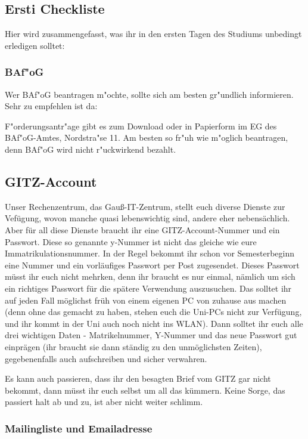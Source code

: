 \subsection{Ersti Checkliste}

Hier wird zusammengefasst, was ihr in den ersten Tagen des Studiums
unbedingt erledigen solltet:

\subsubsection{BAf"oG}

Wer BAf"oG beantragen m"ochte, sollte sich am besten gr"undlich
informieren. Sehr zu empfehlen ist da: \\
\mbox{}
 
F"orderungsantr"age gibt es zum Download oder in Papierform im
EG des BAf"oG-Amtes, Nordstra"se 11. Am besten so fr"uh
wie m"oglich beantragen, denn BAf"oG wird nicht r"uckwirkend
bezahlt.

\subsection{GITZ-Account}
Unser Rechenzentrum, das Gauß-IT-Zentrum, stellt euch diverse 
Dienste zur Vefügung, wovon manche quasi lebenswichtig sind, 
andere eher nebensächlich. Aber für all diese Dienste braucht 
ihr eine GITZ-Account-Nummer und ein Passwort. Diese so genannte 
y-Nummer ist nicht das gleiche wie eure Immatrikulationsnummer. 
In der Regel bekommt ihr schon vor Semesterbeginn eine Nummer 
und ein vorläufiges Passwort per Post zugesendet. Dieses 
Passwort müsst ihr euch nicht mehrken, denn ihr braucht es nur 
einmal, nämlich um sich ein richtiges Passwort für die spätere 
Verwendung auszusuchen. Das solltet ihr auf jeden Fall möglichst 
früh von einem eigenen PC von zuhause aus machen (denn ohne das 
gemacht zu haben, stehen euch die Uni-PCs nicht zur Verfügung, 
und ihr kommt in der Uni auch noch nicht ins WLAN). Dann solltet 
ihr euch alle drei wichtigen Daten - Matrikelnummer, Y-Nummer 
und das neue Passwort gut einprägen (ihr braucht sie dann 
ständig zu den unmöglichsten Zeiten), gegebenenfalls auch 
aufschreiben und sicher verwahren.

Es kann auch passieren, dass ihr den besagten Brief vom GITZ 
gar nicht bekommt, dann müsst ihr euch selbst um all das kümmern. 
Keine Sorge, das passiert halt ab und zu, ist aber nicht weiter 
schlimm.

\subsubsection{Mailingliste und Emailadresse}

